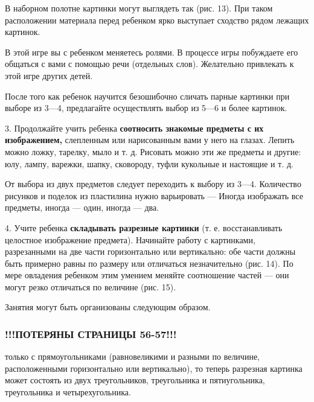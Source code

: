 \documentclass{book}
\begin{document}
В наборном полотне картинки могут выглядеть так (рис. 13). При таком
расположении материала перед ребенком ярко выступает сходство рядом
лежащих картинок.


В этой игре вы с ребенком меняетесь ролями. В процессе игры побуждаете
его общаться с вами с помощью речи (отдельных слов). Желательно
привлекать к этой игре других детей.

После того как ребенок научится безошибочно сличать парные картинки при
выборе из 3---4, предлагайте осуществлять выбор из 5---6 и более
картинок.

3. Продолжайте учить ребенка \textbf{соотносить знакомые предметы с их
изображением,} слепленным или нарисованным вами у него на глазах. Лепить
можно ложку, тарелку, мыло и т. д. Рисовать можно эти же предметы и
другие: юлу, лампу, варежки, шапку, сковороду, туфли кукольные и
настоящие и т. д.

От выбора из двух предметов следует переходить к выбору из 3---4.
Количество рисунков и поделок из пластилина нужно варьировать --- Иногда
изображать все предметы, иногда --- один, иногда --- два.

4. Учите ребенка \textbf{складывать разрезные картинки} (т. е.
восстанавливать целостное изображение предмета). Начинайте работу с
картинками, разрезанными на две части горизонтально или вертикально: обе
части должны быть примерно равны по размеру или отличаться незначительно
(рис. 14). По мере овладения ребенком этим умением меняйте соотношение
частей --- они могут резко отличаться по величине (рис. 15).



Занятия могут быть организованы следующим образом.


\subsubsection{!!!ПОТЕРЯНЫ СТРАНИЦЫ 56-57!!!}

только с
прямоугольниками (равновеликими и разными по величине, расположенными
горизонтально или вертикально), то теперь разрезная картинка может
состоять из двух треугольников, треугольника и пятиугольника,
треугольника и четырехугольника.
\end{document}

